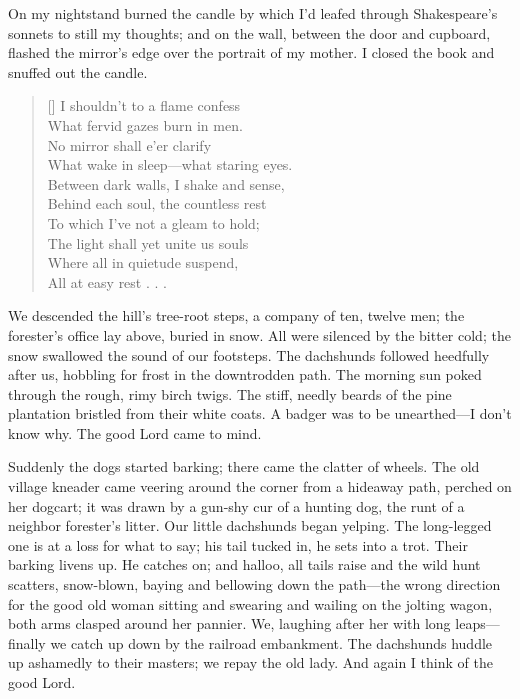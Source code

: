 \documentclass[12pt,a4paper]{article}
\begin{document}
On my nightstand burned the candle by which I’d leafed through Shakespeare’s sonnets to still my thoughts; and on the wall, between the door and cupboard, flashed the mirror’s edge over the portrait of my mother. I closed the book and snuffed out the candle. 
\settowidth{\versewidth}{What wake in sleep—what staring eyes.}
\begin{verse}[\versewidth]
I shouldn’t to a flame confess \\ 
What fervid gazes burn in men. \\
No mirror shall e’er clarify \\
What wake in sleep—what staring eyes. \\
Between dark walls, I shake and sense, \\
Behind each soul, the countless rest \\
To which I’ve not a gleam to hold; \\
The light shall yet unite us souls \\
Where all in quietude suspend, \\
All at easy rest . . . 
\end{verse}

\pagebreak\noindent{}\vspace{10pt}

We descended the hill’s tree-root steps, a company of ten, twelve men; the forester’s office lay above, buried in snow. All were silenced by the bitter cold; the snow swallowed the sound of our footsteps. The dachshunds followed heedfully after us, hobbling for frost in the downtrodden path. The morning sun poked through the rough, rimy birch twigs. The stiff, needly beards of the pine plantation bristled from their white coats. A badger was to be unearthed—I don’t know why. The good Lord came to mind.

Suddenly the dogs started barking; there came the clatter of wheels. The old village kneader came veering around the corner from a hideaway path, perched on her dogcart; it was drawn by a gun-shy cur of a hunting dog, the runt of a neighbor forester’s litter. Our little dachshunds began yelping. The long-legged one is at a loss for what to say; his tail tucked in, he sets into a trot. Their barking livens up. He catches on; and halloo, all tails raise and the wild hunt scatters, snow-blown, baying and bellowing down the path—the wrong direction for the good old woman sitting and swearing and wailing on the jolting wagon, both arms clasped around her pannier. We, laughing after her with long leaps—finally we catch up down by the railroad embankment. The dachshunds huddle up ashamedly to their masters; we repay the old lady. And again I think of the good Lord.
\end{document}
